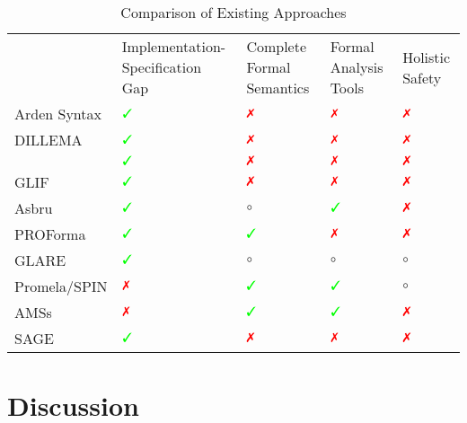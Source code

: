   \begin{table}[ht]
    \begin{tabularx}{\textwidth}
   {>{\centering\arraybackslash}X
   || >{\centering\arraybackslash}X
   | >{\centering\arraybackslash}X
   | >{\centering\arraybackslash}X
   | >{\centering\arraybackslash}X
 }
                 & Implementation-Specification Gap & Complete Formal Semantics & Formal Analysis Tools & Holistic Safety  \\
    Arden Syntax & $\greencheck$                    & $\redcross$               & $\redcross$           & $\redcross$ \\
    DILLEMA      & $\greencheck$                    & $\redcross$               & $\redcross$           & $\redcross$ \\
    \GEODECM{}   & $\greencheck$                    & $\redcross$               & $\redcross$           & $\redcross$ \\
    GLIF         & $\greencheck$                    & $\redcross$               & $\redcross$           & $\redcross$ \\
    Asbru        & $\greencheck$                    & $\circ$                   & $\greencheck$         & $\redcross$ \\
    PROForma     & $\greencheck$                    & $\greencheck$             & $\redcross$           & $\redcross$ \\
    GLARE        & $\greencheck$                    & $\circ$                   & $\circ$               & $\circ$     \\
    Promela/SPIN & $\redcross$                      & $\greencheck$             & $\greencheck$         & $\circ$     \\
    AMSs         & $\redcross$                      & $\greencheck$             & $\greencheck$         & $\redcross$ \\
    SAGE         & $\greencheck$                    & $\redcross$               & $\redcross$           & $\redcross$ \\
  \end{tabularx}
  \caption{Comparison of Existing Approaches}\label{table:dsl-comparison}
  \end{table}

\section{Discussion}

